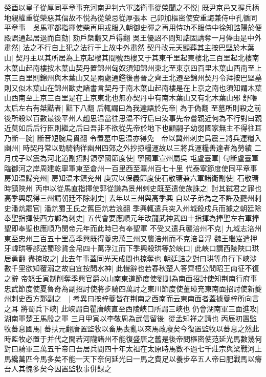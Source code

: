 癸酉以皇子從厚同平章事充河南尹判六軍諸衛事從榮聞之不悦|{
	既尹京邑又握兵柄地親權重從榮惡其偪故不悦為從榮忌從厚張本}
己卯加樞密使安重誨兼侍中孔循同平章事　吳馬軍都指揮使柴再用戎服入朝御史彈之再用恃功不服侍中徐知誥陽於便殿誤通起居退而自劾|{
	劾戶槩翻又戶得翻}
吳王優詔不問知誥固請奪一月俸由是中外肅然|{
	法之不行自上犯之法行于上故中外肅然}
契丹改元天顯葬其主按巴堅於木葉山|{
	契丹主以其所居為上京起樓其間號西樓又于其東千里起東樓北三百里起北樓南木葉山起南樓按木葉山契丹置錦州匈奴須知錦州東北至東京四百里木葉山西南至上京三百里則錦州與木葉山又是兩處通鑑後書晉之齊王北遷至錦州契丹令拜按巴堅墓則又似木葉山在錦州歐史諸書言契丹于南木葉山起南樓是在上京之南也須知謂木葉山西南至上京三百里是在上京東北也無亦契丹中有南木葉山又有北木葉山邪}
舒嚕太后左右有桀黠者|{
	黠下八翻}
后輒謂曰為我達語於先帝|{
	為于偽翻}
至墓所則殺之前後所殺以百數最後平州人趙思温當往思温不行后曰汝事先帝嘗親近何為不行對曰親近莫如后后行臣則繼之后曰吾非不欲從先帝於地下也顧嗣子幼弱國家無主不得往耳乃斷一腕|{
	斷音短腕烏貫翻}
令置墓中思温亦得免　帝以冀州刺史烏震三將兵運糧入幽州|{
	時契丹常以勁騎徜徉幽州四郊之外抄掠糧運故以三將兵運糧善達者為勞績}
二月戊子以震為河北道副招討領寧國節度使|{
	寧國軍宣州屬吳}
屯盧臺軍|{
	句斷盧臺軍臨御河之岸周建乾寧軍東至倉州一百里西至瀛州百七十里}
代泰寧節度使同平章事房知温歸兖州|{
	房知温本鎮兖州}
庚寅以保義節度使石敬瑭兼六軍諸衛副使|{
	石敬瑭時鎮陜州}
丙申以從馬直指揮使郭從謙為景州刺史既至遣使族誅之|{
	討其弑君之罪也}
高季興既得三州請朝廷不除刺史|{
	去年以三州與高季興}
自以子弟為之不許及夔州刺史潘炕罷官|{
	潘炕蜀王氏之舊臣炕若浪翻}
季興輒遣兵突入州城殺戍兵而據之朝廷除奉聖指揮使西方鄴為刺史|{
	五代會要應順元年改龍武神武四十指揮為捧聖左右軍捧聖即奉聖也應順乃閔帝元年而此時已有奉聖軍}
不受又遣兵襲涪州不克|{
	九域志涪州東至忠州三百五十里高季興既得夔忠萬三州又襲涪州而不克涪音浮}
魏王繼岌遣押牙韓珙等部送蜀珍貨金帛四十萬浮江而下季興殺珙等於峽口|{
	此峽口謂西陵陜口珙居勇翻}
盡掠取之|{
	此去年事蓋同光天成間也掠奪也}
朝廷詰之對曰珙等舟行下峽涉數千里欲知覆溺之故自宜按問水神|{
	此慢辭也若春秋楚人答齊桓公問昭王南征不復之辭}
帝怒壬寅制削奪季興官爵以山南東道節度使劉訓為南面招討使知荆南行府事忠武節度使夏魯奇為副招討使將步騎四萬討之東川節度使董璋充東南面招討使新夔州刺史西方鄴副之　|{
	考異曰按梓夔皆在荆南之西南而云東南面者蓋據夔梓所向言之耳}
將蜀兵下峽|{
	此峽謂自瞿唐峽直至西陵峽口所謂三峽也}
仍會湖南軍三面進攻|{
	湖南軍楚王馬殷之軍}
三月甲寅以李敬周為武信留後|{
	從孟知祥之請也}
丙辰初置監牧蕃息國馬|{
	蕃扶元翻唐置監牧以畜馬喪亂以來馬政廢矣今復置監牧以蕃息之然此時監牧必置于并代之間若河隴諸州不能復盛唐之舊是後帝問樞密使范延光馬數幾何對曰騎軍三萬五千帝曰吾居兵間四十年太祖在太原時馬數不過七千莊宗與梁戰河上馬纔萬匹今馬多矣不能一天下奈何延光曰一馬之費足以養步卒五人帝曰肥戰馬以瘠吾人其愧多矣今因置監牧事併録之}
